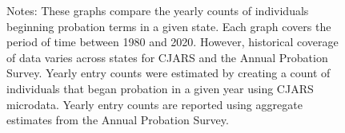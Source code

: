 \begin{figure}
\begin{minipage}{\linewidth}
Notes: These graphs compare the yearly counts of individuals beginning probation terms in a given state. Each graph covers the period of time between 1980 and 2020. However, historical coverage of data varies across states for CJARS and the Annual Probation Survey. Yearly entry counts were estimated by creating a count of individuals that began probation in a given year using CJARS microdata. Yearly entry counts are reported using aggregate estimates from the Annual Probation Survey.
\end{minipage}
\end{figure}
